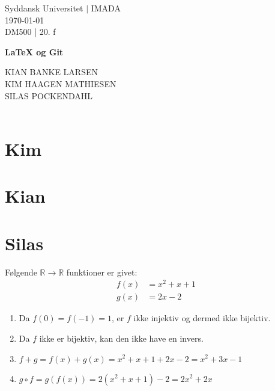 \documentclass[12pt, a4paper]{article}
\begin{document}
\begin{titlepage}
\begin{centering}
\large Syddansk Universitet $|$ IMADA \\
\today \\
DM500 | 20. f\\

\vspace{4CM}

\huge{\bf \LaTeX{} og Git } \\

\vspace{\fill}

\fontsize{14}{19.2} {
    \selectfont
    KIAN BANKE LARSEN \vspace{5pt} \\
    KIM HAAGEN MATHIESEN \vspace{5pt} \\
    SILAS POCKENDAHL \vspace{5pt} \\
    \quad
} \\

\vspace{\fill}


\end{centering}

\thispagestyle{empty}
\end{titlepage}

\pagestyle{fancy}
\setlength{\headheight}{15pt}
\setlength{\headsep}{15pt}
\fancyhf{}
\rhead{\today}


\section{Kim}
\section{Kian}
\section{Silas}
Følgende $\mathbb{R} \rightarrow \mathbb{R}$ funktioner er givet:
\begin{align*}
	f(x) & = x^2+x+1 \\
	g(x) & = 2x -2
\end{align*}
\begin{enumerate}[label=\alph*)]
	\item {
		Da $f(0)=f(-1)=1$, er $f$ ikke injektiv og dermed ikke bijektiv.
	}
	\item {
		Da $f$ ikke er bijektiv, kan den ikke have en invers.
	}
	\item {
		$f+g=f(x)+g(x)=x^2+x+1+2x-2=x^2+3x-1$
	}
	\item {
		$g\circ f=g(f(x))=2(x^2+x+1)-2=2x^2+2x$
	}
\end{enumerate}
\end{document}
